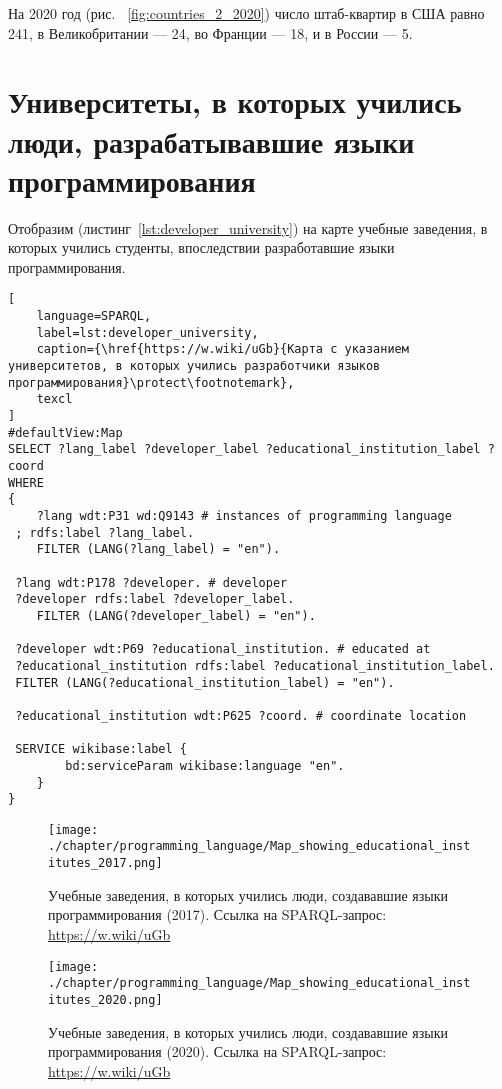 На 2020 год (рис. ~\ref{fig:countries_2_2020}) число штаб-квартир в США равно 241, в Великобритании — 24, во Франции — 18, и в России — 5.

\section{Университеты, в которых учились люди, разрабатывавшие языки программирования}
Отобразим (листинг~\ref{lst:developer_university}) на карте учебные заведения, в которых учились студенты, впоследствии разработавшие языки программирования.

\begin{lstlisting}[
	language=SPARQL,
	label=lst:developer_university,
	caption={\href{https://w.wiki/uGb}{Карта с указанием университетов, в которых учились разработчики языков программирования}\protect\footnotemark},
	texcl
]
#defaultView:Map
SELECT ?lang_label ?developer_label ?educational_institution_label ?coord
WHERE
{
 	?lang wdt:P31 wd:Q9143 # instances of programming language
 ; rdfs:label ?lang_label. 
 	FILTER (LANG(?lang_label) = "en"). 
 
 ?lang wdt:P178 ?developer. # developer
 ?developer rdfs:label ?developer_label. 
 	FILTER (LANG(?developer_label) = "en"). 
 		
 ?developer wdt:P69 ?educational_institution. # educated at
 ?educational_institution rdfs:label ?educational_institution_label. 
 FILTER (LANG(?educational_institution_label) = "en").
 
 ?educational_institution wdt:P625 ?coord. # coordinate location

 SERVICE wikibase:label {
		bd:serviceParam wikibase:language "en".
	} 	
}
\end{lstlisting}

\begin{figure}[h]
\centering
	\texttt{[image: ./chapter/programming\_language/Map\_showing\_educational\_institutes\_2017.png]}
	\caption{Учебные заведения, в которых учились люди, создававшие языки программирования (2017). Ссылка на SPARQL-запрос: \href{https://w.wiki/uGb}{https://w.wiki/uGb}}
	\label{fig:universities_2017}
\end{figure}
\begin{figure}[h]
\centering
	\texttt{[image: ./chapter/programming\_language/Map\_showing\_educational\_institutes\_2020.png]}
	\caption{Учебные заведения, в которых учились люди, создававшие языки программирования (2020). Ссылка на SPARQL-запрос: \href{https://w.wiki/uGb}{https://w.wiki/uGb}}
	\label{fig:universities_2020}
\end{figure}



